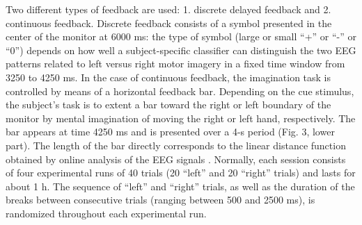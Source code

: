 \documentclass[journal,twocolumn]{IEEEtran}
\begin{document}
Two different types of feedback are used: 1. discrete delayed feedback and 2. continuous feedback. Discrete feedback consists of a symbol presented in the center of the monitor at 6000 ms: the type of symbol (large or small “+” or “-” or “0”) depends on how well a subject-specific classifier can distinguish the two EEG patterns related to left versus right motor imagery in a fixed time window from 3250 to 4250 ms. In the case of continuous feedback, the imagination task is controlled by means of a horizontal feedback bar. Depending on the cue stimulus, the subject’s task is to extent a bar toward the right or left boundary of the monitor by mental imagination of moving the right or left hand, respectively. The bar appears at time 4250 ms and is presented over a 4-s period (Fig. 3, lower part). The length of the bar directly corresponds to the linear distance function obtained by online analysis of the EEG signals \cite{neuper1999enhancement}. Normally, each session consists of four experimental runs of 40 trials (20 “left” and 20 “right” trials) and lasts for about 1 h. The sequence of “left” and “right” trials, as well as the duration of the breaks between consecutive trials (ranging between 500 and 2500 ms), is randomized throughout each experimental run.
\end{document}
